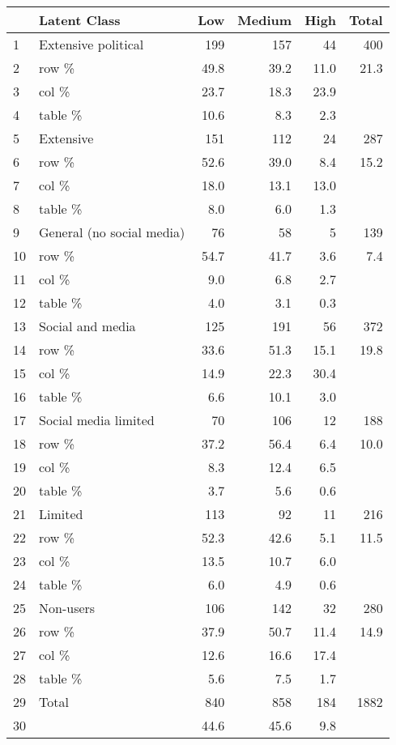 \documentclass{article}
\begin{document}
\begin{table}[ht]
\centering
\begin{tabular}{llrrrr}
  \hline
 & Latent Class & Low & Medium & High & Total \\ 
  \hline
1 & Extensive political & 199 & 157 & 44 & 400 \\ 
  2 & row \% & 49.8 & 39.2 & 11.0 & 21.3 \\ 
  3 & col \% & 23.7 & 18.3 & 23.9 &  \\ 
  4 & table \% & 10.6 & 8.3 & 2.3 &  \\ 
  5 & Extensive & 151 & 112 & 24 & 287 \\ 
  6 & row \% & 52.6 & 39.0 & 8.4 & 15.2 \\ 
  7 & col \% & 18.0 & 13.1 & 13.0 &  \\ 
  8 & table \% & 8.0 & 6.0 & 1.3 &  \\ 
  9 & General (no social media) & 76 & 58 & 5 & 139 \\ 
  10 & row \% & 54.7 & 41.7 & 3.6 & 7.4 \\ 
  11 & col \% & 9.0 & 6.8 & 2.7 &  \\ 
  12 & table \% & 4.0 & 3.1 & 0.3 &  \\ 
  13 & Social and media & 125 & 191 & 56 & 372 \\ 
  14 & row \% & 33.6 & 51.3 & 15.1 & 19.8 \\ 
  15 & col \% & 14.9 & 22.3 & 30.4 &  \\ 
  16 & table \% & 6.6 & 10.1 & 3.0 &  \\ 
  17 & Social media limited & 70 & 106 & 12 & 188 \\ 
  18 & row \% & 37.2 & 56.4 & 6.4 & 10.0 \\ 
  19 & col \% & 8.3 & 12.4 & 6.5 &  \\ 
  20 & table \% & 3.7 & 5.6 & 0.6 &  \\ 
  21 & Limited & 113 & 92 & 11 & 216 \\ 
  22 & row \% & 52.3 & 42.6 & 5.1 & 11.5 \\ 
  23 & col \% & 13.5 & 10.7 & 6.0 &  \\ 
  24 & table \% & 6.0 & 4.9 & 0.6 &  \\ 
  25 & Non-users & 106 & 142 & 32 & 280 \\ 
  26 & row \% & 37.9 & 50.7 & 11.4 & 14.9 \\ 
  27 & col \% & 12.6 & 16.6 & 17.4 &  \\ 
  28 & table \% & 5.6 & 7.5 & 1.7 &  \\ 
  29 & Total & 840 & 858 & 184 & 1882 \\ 
  30 &  & 44.6 & 45.6 & 9.8 &  \\ 
   \hline
\end{tabular}
\end{table}
\end{document}
